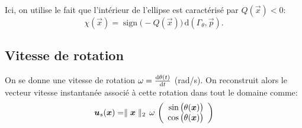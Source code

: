 \documentclass[10pt,a4paper]{article}
\begin{document}
Ici, on utilise le fait que l'intérieur de l'ellipse est caractérisé par $Q(\vec{x}) < 0$:
\begin{equation}
\chi(\vec{x}) = \operatorname{sign}\big(-Q(\vec{x})\big)\,\mathrm d(\Gamma_\theta, \vec{p}).
\end{equation}
%
%
%
\subsection{Vitesse de rotation}
%
%
%
On se donne une vitesse de rotation $\omega = \frac{\mathrm{d} \theta(t)}{\mathrm{d} t}$ (rad/s).
On reconstruit alors le vecteur vitesse instantanée associé à cette rotation dans tout le domaine comme:
$$
\boldsymbol{u}_s(\boldsymbol{x}) 
= 
\parallel \boldsymbol{x} \parallel_2\,\omega\,
\left(
\begin{array}{r}
 \sin\big(\theta(\boldsymbol{x})\big) \\
 \cos\big(\theta(\boldsymbol{x})\big)
\end{array}
\right)
$$
%
%
%
%
%
%
%

%
%
%
%

%
%
%
%
%
%
%
\end{document}

